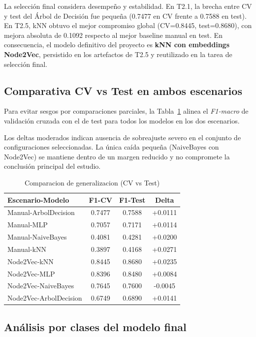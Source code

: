 \documentclass[conference,a4paper]{IEEEtran}
\begin{document}
La selección final considera desempeño y estabilidad. En T2.1, la brecha entre CV y test del Árbol de Decisión fue pequeña (0.7477 en CV frente a 0.7588 en test). En T2.5, kNN obtuvo el mejor compromiso global (CV=0.8445, test=0.8680), con mejora absoluta de 0.1092 respecto al mejor baseline manual en test. En consecuencia, el modelo definitivo del proyecto es \textbf{kNN con embeddings Node2Vec}, persistido en los artefactos de T2.5 y reutilizado en la tarea de selección final.

\subsection{Comparativa CV vs Test en ambos escenarios}

Para evitar sesgos por comparaciones parciales, la Tabla~\ref{tab:cv-test-final} alinea el \textit{F1-macro} de validación cruzada con el de test para todos los modelos en los dos escenarios.

Los deltas moderados indican ausencia de sobreajuste severo en el conjunto de configuraciones seleccionadas. La única caída pequeña (NaiveBayes con Node2Vec) se mantiene dentro de un margen reducido y no compromete la conclusión principal del estudio.

\begin{table}[htbp]
\caption{Comparacion de generalizacion (CV vs Test)}
\centering
\begin{tabular}{lccc}
\toprule
Escenario-Modelo & F1-CV & F1-Test & Delta \\
\midrule
Manual-ArbolDecision & 0.7477 & 0.7588 & +0.0111 \\
Manual-MLP & 0.7057 & 0.7171 & +0.0114 \\
Manual-NaiveBayes & 0.4081 & 0.4281 & +0.0200 \\
Manual-kNN & 0.3897 & 0.4168 & +0.0271 \\
Node2Vec-kNN & 0.8445 & 0.8680 & +0.0235 \\
Node2Vec-MLP & 0.8396 & 0.8480 & +0.0084 \\
Node2Vec-NaiveBayes & 0.7645 & 0.7600 & -0.0045 \\
Node2Vec-ArbolDecision & 0.6749 & 0.6890 & +0.0141 \\
\bottomrule
\end{tabular}
\label{tab:cv-test-final}
\end{table}


\subsection{Análisis por clases del modelo final}
\end{document}
